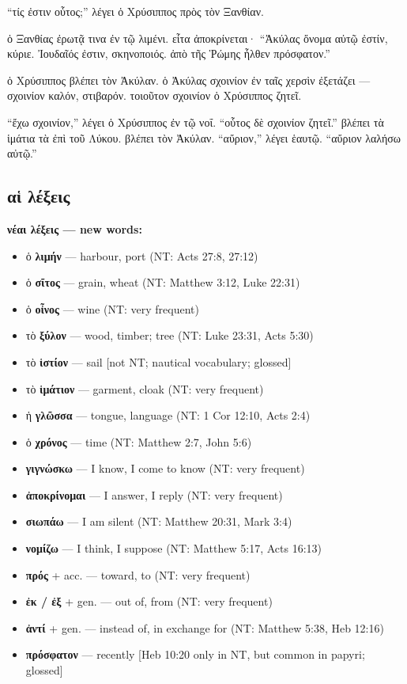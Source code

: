 \documentclass[a4paper]{report}
\begin{document}
``τίς ἐστιν οὗτος;'' λέγει ὁ Χρύσιππος πρὸς τὸν Ξανθίαν.

ὁ Ξανθίας ἐρωτᾷ τινα ἐν τῷ λιμένι. εἶτα ἀποκρίνεται· ``Ἀκύλας ὄνομα αὐτῷ
ἐστίν, κύριε. Ἰουδαῖός ἐστιν, σκηνοποιός. ἀπὸ τῆς Ῥώμης ἦλθεν
πρόσφατον.''

ὁ Χρύσιππος βλέπει τὸν Ἀκύλαν. ὁ Ἀκύλας σχοινίον ἐν ταῖς χερσὶν ἐξετάζει
--- σχοινίον καλόν, στιβαρόν. τοιοῦτον σχοινίον ὁ Χρύσιππος ζητεῖ.

``ἔχω σχοινίον,'' λέγει ὁ Χρύσιππος ἐν τῷ νοΐ. ``οὗτος δὲ σχοινίον
ζητεῖ.'' βλέπει τὰ ἱμάτια τὰ ἐπὶ τοῦ Λύκου. βλέπει τὸν Ἀκύλαν.
``αὔριον,'' λέγει ἑαυτῷ. ``αὔριον λαλήσω αὐτῷ.''

\subsection{αἱ
λέξεις}\label{ux3b1ux1f31-ux3bbux3adux3beux3b5ux3b9ux3c2-2}

\textbf{νέαι λέξεις --- new words:}

\begin{itemize}
\tightlist
\item
  ὁ \textbf{λιμήν} --- harbour, port (NT: Acts 27:8, 27:12)
\item
  ὁ \textbf{σῖτος} --- grain, wheat (NT: Matthew 3:12, Luke 22:31)
\item
  ὁ \textbf{οἶνος} --- wine (NT: very frequent)
\item
  τὸ \textbf{ξύλον} --- wood, timber; tree (NT: Luke 23:31, Acts 5:30)
\item
  τὸ \textbf{ἱστίον} --- sail {[}not NT; nautical vocabulary; glossed{]}
\item
  τὸ \textbf{ἱμάτιον} --- garment, cloak (NT: very frequent)
\item
  ἡ \textbf{γλῶσσα} --- tongue, language (NT: 1 Cor 12:10, Acts 2:4)
\item
  ὁ \textbf{χρόνος} --- time (NT: Matthew 2:7, John 5:6)
\item
  \textbf{γιγνώσκω} --- I know, I come to know (NT: very frequent)
\item
  \textbf{ἀποκρίνομαι} --- I answer, I reply (NT: very frequent)
\item
  \textbf{σιωπάω} --- I am silent (NT: Matthew 20:31, Mark 3:4)
\item
  \textbf{νομίζω} --- I think, I suppose (NT: Matthew 5:17, Acts 16:13)
\item
  \textbf{πρός} + acc. --- toward, to (NT: very frequent)
\item
  \textbf{ἐκ / ἐξ} + gen. --- out of, from (NT: very frequent)
\item
  \textbf{ἀντί} + gen. --- instead of, in exchange for (NT: Matthew
  5:38, Heb 12:16)
\item
  \textbf{πρόσφατον} --- recently {[}Heb 10:20 only in NT, but common in
  papyri; glossed{]}
\end{itemize}
\end{document}
